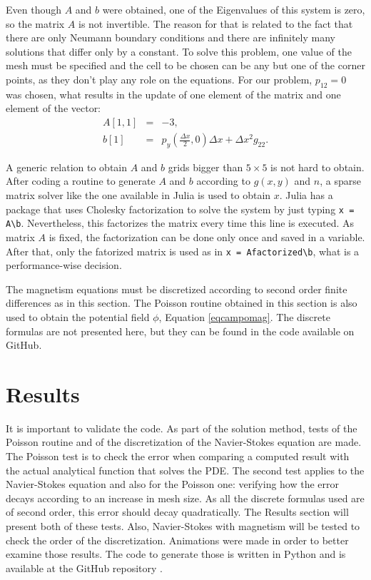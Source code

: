 \documentclass[journal]{IEEEtran}
\begin{document}
Even though $A$ and $b$ were obtained, one of the Eigenvalues of this system is zero, so the matrix $A$ is not invertible. The reason for that is related to the fact that there are only Neumann boundary conditions and there are infinitely many solutions that differ only by a constant. To solve this problem, one value of the mesh must be specified and the cell to be chosen can be any but one of the corner points, as they don't play any role on the equations. For our problem, $p_{12} = 0$ was chosen, what results in the update of one element of the matrix and one element of the vector: \begin{eqnarray}
A[1,1] &=& -3 \label{aupdate}, \\
b[1] & = & p_y\left(\frac{\Delta x}{2},0\right)\Delta x + \Delta x^2 g_{22}. \label{bupdate}
\end{eqnarray}

A generic relation to obtain $A$ and $b$ grids bigger than $5\times 5$ is not hard to obtain. After coding a routine to generate $A$ and $b$ according to $g(x,y)$ and $n$, a sparse matrix solver like the one available in Julia\cite{JuliaProgramming} is used to obtain $x$. Julia has a package that uses Cholesky factorization to solve the system by just typing \texttt{x = A\textbackslash b}. Nevertheless, this factorizes the matrix every time this line is executed. As matrix $A$ is fixed, the factorization can be done only once and saved in a variable. After that, only the fatorized matrix is used as in \texttt{x = Afactorized\textbackslash  b}, what is a performance-wise decision.

The magnetism equations must be discretized according to second order finite differences as in this section. The Poisson routine obtained in this section is also used to obtain the potential field $\phi$, Equation \ref{eqcampomag}. The discrete formulas are not presented here, but they can be found in the code available on GitHub.



\section{Results}

It is important to validate the code. As part of the solution method, tests of the Poisson routine and of the discretization of the Navier-Stokes equation are made. The Poisson test is to check the error when comparing a computed result with the actual analytical function that solves the PDE. The second test applies to the Navier-Stokes equation and also for the Poisson one: verifying how the error decays according to an increase in mesh size. As all the discrete formulas used are of second order, this error should decay quadratically. The Results section will present both of these tests. Also, Navier-Stokes with magnetism will be tested to check the order of the discretization. Animations were made in order to better examine those results. The code to generate those is written in Python and is available at the GitHub repository \cite{gitHubFerrofluidos}.
\end{document}
